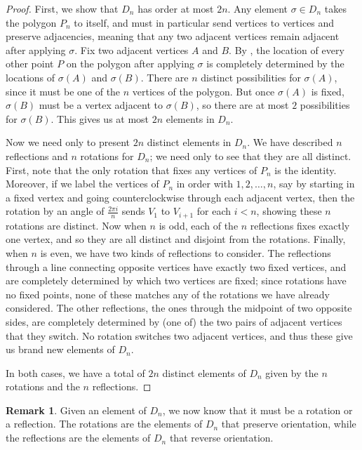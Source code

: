 \documentclass[12pt]{report}
\numberwithin{equation}{section}
\numberwithin{theorem}{chapter}
\theoremstyle{definition}
\newtheorem*{basic properties}{Basic Properties}
\newtheorem*{Important Remark}{Important Remark}
\newtheorem{remark}[theorem]{Remark}
\begin{document}
\begin{proof}
	First, we show that $D_n$ has order at most $2n$. Any element $\sigma \in D_n$ takes the polygon $P_n$ to itself, and must in particular send vertices to vertices and preserve adjacencies, meaning that any two adjacent vertices remain adjacent after applying $\sigma$. Fix two adjacent vertices $A$ and $B$. By , the location of every other point $P$ on the polygon after applying $\sigma$ is completely determined by the locations of $\sigma(A)$ and $\sigma(B)$. There are $n$ distinct possibilities for $\sigma(A)$, since it must be one of the $n$ vertices of the polygon. But once $\sigma(A)$ is fixed, $\sigma(B)$ must be a vertex adjacent to $\sigma(B)$, so there are at most $2$ possibilities for $\sigma(B)$. This gives us at most $2n$ elements in $D_n$.
	
	Now we need only to present $2n$ distinct elements in $D_n$. We have described $n$ reflections and $n$ rotations for $D_n$; we need only to see that they are all distinct. First, note that the only rotation that fixes any vertices of $P_n$ is the identity. Moreover, if we label the vertices of $P_n$ in order with $1, 2, \ldots, n$, say by starting in a fixed vertex and going counterclockwise through each adjacent vertex, then the rotation by an angle of $\frac{2 \pi i}{n}$ sends $V_{1}$ to $V_{i+1}$ for each $i<n$, showing these $n$ rotations are distinct. Now when $n$ is odd, each of the $n$ reflections fixes exactly one vertex, and so they are all distinct and disjoint from the rotations. Finally, when $n$ is even, we have two kinds of reflections to consider. The reflections through a line connecting opposite vertices have exactly two fixed vertices, and are completely determined by which two vertices are fixed; since rotations have no fixed points, none of these matches any of the rotations we have already considered. The other reflections, the ones through the midpoint of two opposite sides, are completely determined by (one of) the two pairs of adjacent vertices that they switch. No rotation switches two adjacent vertices, and thus these give us brand new elements of $D_n$. 
	
	
In both cases, we have a total of $2n$ distinct elements of $D_n$ given by the $n$ rotations and the $n$ reflections.
\end{proof}




\begin{remark}
	Given an element of $D_n$, we now know that it must be a rotation or a reflection. The rotations are the elements of $D_n$ that preserve orientation, while the reflections are the elements of $D_n$ that reverse orientation.
\end{remark}
\end{document}
